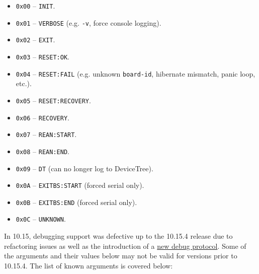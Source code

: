 \documentclass[]{article}
\providecommand{\tightlist}{%
  \setlength{\itemsep}{0pt}\setlength{\parskip}{0pt}}
\begin{document}
\begin{itemize}
  \begin{itemize}
  \tightlist
  \item \texttt{0x00} -- \texttt{INIT}.
  \item \texttt{0x01} -- \texttt{VERBOSE} (e.g. \texttt{-v}, force console logging).
  \item \texttt{0x02} -- \texttt{EXIT}.
  \item \texttt{0x03} -- \texttt{RESET:OK}.
  \item \texttt{0x04} -- \texttt{RESET:FAIL} (e.g. unknown \texttt{board-id}, hibernate mismatch, panic loop, etc.).
  \item \texttt{0x05} -- \texttt{RESET:RECOVERY}.
  \item \texttt{0x06} -- \texttt{RECOVERY}.
  \item \texttt{0x07} -- \texttt{REAN:START}.
  \item \texttt{0x08} -- \texttt{REAN:END}.
  \item \texttt{0x09} -- \texttt{DT} (can no longer log to DeviceTree).
  \item \texttt{0x0A} -- \texttt{EXITBS:START} (forced serial only).
  \item \texttt{0x0B} -- \texttt{EXITBS:END} (forced serial only).
  \item \texttt{0x0C} -- \texttt{UNKNOWN}.
  \end{itemize}

  In 10.15, debugging support was defective up to the 10.15.4 release due to
  refactoring issues as well as the introduction of a
  \href{https://github.com/acidanthera/MaxRegnerPkg/blob/master/Include/Apple/Protocol/AppleDebugLog.h}{new debug protocol}.
  Some of the arguments and their values below may not be valid for versions prior
  to 10.15.4. The list of known arguments is covered below:


\end{itemize}
\end{document}

